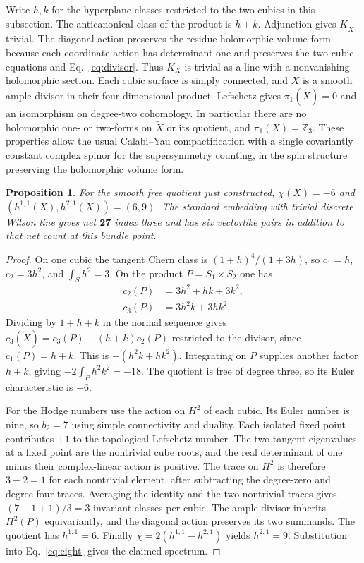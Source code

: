 \documentclass[aps,prd,reprint,onecolumn,nofootinbib,amsmath,amssymb]{revtex4-2}
\newtheorem{proposition}{Proposition}
\begin{document}
Write $h,k$ for the hyperplane classes restricted to the two cubics in this subsection. The anticanonical class of the product is $h+k$. Adjunction gives $K_{\widetilde X}$ trivial. The diagonal action preserves the residue holomorphic volume form because each coordinate action has determinant one and preserves the two cubic equations and Eq.~\eqref{eq:divisor}. Thus $K_X$ is trivial as a line with a nonvanishing holomorphic section. Each cubic surface is simply connected, and $\widetilde X$ is a smooth ample divisor in their four-dimensional product. Lefschetz gives $\pi_1(\widetilde X)=0$ and an isomorphism on degree-two cohomology. In particular there are no holomorphic one- or two-forms on $\widetilde X$ or its quotient, and $\pi_1(X)=\mathbb Z_3$. These properties allow the usual Calabi--Yau compactification with a single covariantly constant complex spinor for the supersymmetry counting, in the spin structure preserving the holomorphic volume form.

\begin{proposition}
For the smooth free quotient just constructed, $\chi(X)=-6$ and $(h^{1,1}(X),h^{2,1}(X))=(6,9)$. The standard embedding with trivial discrete Wilson line gives net $\mathbf{27}$ index three and has six vectorlike pairs in addition to that net count at this bundle point.
\end{proposition}

\begin{proof}
On one cubic the tangent Chern class is $(1+h)^4/(1+3h)$, so $c_1=h$, $c_2=3h^2$, and $\int_S h^2=3$. On the product $P=S_1\times S_2$ one has
\begin{equation}
\begin{aligned}
 c_2(P)&=3h^2+hk+3k^2,\\
 c_3(P)&=3h^2k+3hk^2 .
\end{aligned}
\end{equation}
Dividing by $1+h+k$ in the normal sequence gives $c_3(\widetilde X)=c_3(P)-(h+k)c_2(P)$ restricted to the divisor, since $c_1(P)=h+k$. This is $-(h^2k+hk^2)$. Integrating on $P$ supplies another factor $h+k$, giving $-2\int_P h^2k^2=-18$. The quotient is free of degree three, so its Euler characteristic is $-6$.

For the Hodge numbers use the action on $H^2$ of each cubic. Its Euler number is nine, so $b_2=7$ using simple connectivity and duality. Each isolated fixed point contributes $+1$ to the topological Lefschetz number. The two tangent eigenvalues at a fixed point are the nontrivial cube roots, and the real determinant of one minus their complex-linear action is positive. The trace on $H^2$ is therefore $3-2=1$ for each nontrivial element, after subtracting the degree-zero and degree-four traces. Averaging the identity and the two nontrivial traces gives $(7+1+1)/3=3$ invariant classes per cubic. The ample divisor inherits $H^2(P)$ equivariantly, and the diagonal action preserves its two summands. The quotient has $h^{1,1}=6$. Finally $\chi=2(h^{1,1}-h^{2,1})$ yields $h^{2,1}=9$. Substitution into Eq.~\eqref{eq:eight} gives the claimed spectrum.
\end{proof}
\end{document}
